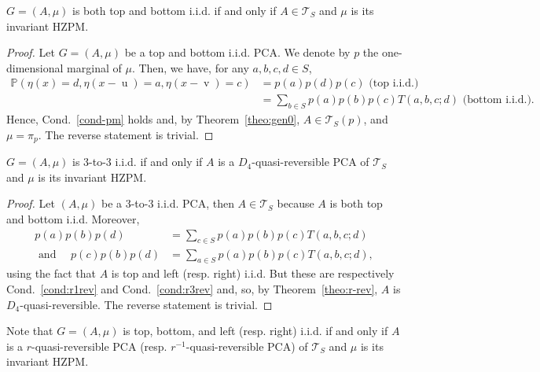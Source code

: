 \documentclass[AHL,Unicode,longabstracts]{cedram}
\newcounter{a}
\newcommand{\Cond}{Cond.}
\newcommand{\triang}[2]{\mathcal{T}_{#1} \left(#2 \right)}
\newcommand{\triangE}[1]{\mathcal{T}_{#1}}
\newcommand{\Pbb}{\mathbb{P}}
\DeclareMathOperator{\vu}{u}
\DeclareMathOperator{\vv}{v}
\begin{document}
\begin{prop}
$G=(A,\mu)$ is both top and bottom i.i.d. if and only if $A \in \triangE{S}$ and $\mu$ is its invariant HZPM.
\end{prop}

\begin{proof}
Let $G=(A,\mu)$ be a top and bottom i.i.d. PCA. We denote by $p$ the one-dimensional marginal of $\mu$. Then, we have, for any $a,b,c,d \in S$,
\begin{align*}
\Pbb\left(\eta(x)=d,\eta(x-\vu)=a,\eta(x-\vv)=c\right) & = p(a) p(d) p(c) \text{ (top i.i.d.)} \\
& =\!\sum_{b\in S} p(a) p(b) p(c) T(a,b,c;d)\!\!\text{ (bottom i.i.d.)}.
\end{align*}
Hence, \Cond~\ref{cond-pm} holds and, by Theorem~\ref{theo:gen0}, $A \in \triang{S}{p}$, and $\mu=\pi_p$. The reverse statement is trivial.
\end{proof}

\begin{prop}
$G=(A,\mu)$ is 3-to-3 i.i.d. if and only if $A$ is a $D_4$-quasi-reversible PCA of $\triangE{S}$ and $\mu$ is its invariant HZPM.
\end{prop}

\begin{proof}
Let $(A,\mu)$ be a 3-to-3 i.i.d. PCA, then $A \in \triangE{S}$ because $A$ is both top and bottom i.i.d. Moreover,
\begin{align*}
p(a)p(b)p(d) & = \sum_{c\in S} p(a)p(b)p(c) T(a,b,c;d) \\
\text{ and } \quad p(c)p(b)p(d) & = \sum_{a\in S} p(a)p(b)p(c) T(a,b,c;d),
\end{align*}
using the fact that $A$ is top and left (resp. right) i.i.d. But these are respectively \Cond~\ref{cond:r1rev} and \Cond~\ref{cond:r3rev} and, so, by Theorem~\ref{theo:r-rev}, $A$ is $D_4$-quasi-reversible. The reverse statement is trivial.
\end{proof}

Note that $G=(A,\mu)$ is top, bottom, and left (resp. right) i.i.d. if and only if $A$ is a $r$-quasi-reversible PCA (resp. $r^{-1}$-quasi-reversible PCA) of $\triangE{S}$ and $\mu$ is its invariant HZPM.
\end{document}
